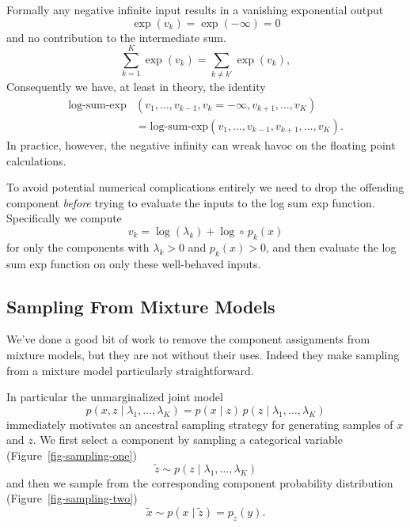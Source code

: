 \documentclass[
  letterpaper,
  DIV=11,
  numbers=noendperiod]{scrartcl}
\begin{document}
Formally any negative infinite input results in a vanishing exponential
output \[
\exp(v_{k}) = \exp(-\infty) = 0
\] and no contribution to the intermediate sum. \[
\sum_{k = 1}^{K} \exp(v_{k}) = \sum_{k \ne k'} \exp (v_{k}),
\] Consequently we have, at least in theory, the identity \begin{align*}
\text{log-sum-exp}&(v_{1}, \ldots, v_{k - 1}, v_{k} = -\infty,
                    v_{k + 1}, \ldots, v_{K})
\\
&=
\text{log-sum-exp}(v_{1}, \ldots, v_{k - 1},
                   v_{k + 1}, \ldots, v_{K}).
\end{align*} In practice, however, the negative infinity can wreak havoc
on the floating point calculations.

To avoid potential numerical complications entirely we need to drop the
offending component \emph{before} trying to evaluate the inputs to the
log sum exp function. Specifically we compute \[
v_{k} = \log(\lambda_{k}) + \log \circ \, p_{k} (x)
\] for only the components with \(\lambda_{k} > 0\) and
\(p_{k}(x) > 0\), and then evaluate the log sum exp function on only
these well-behaved inputs.

\subsection{Sampling From Mixture Models}\label{sec:sampling}

We've done a good bit of work to remove the component assignments from
mixture models, but they are not without their uses. Indeed they make
sampling from a mixture model particularly straightforward.

In particular the unmarginalized joint model \[
p(x, z \mid \lambda_{1}, \ldots, \lambda_{K})
=
p(x \mid z) \, p(z \mid \lambda_{1}, \ldots, \lambda_{K})
\] immediately motivates an ancestral sampling strategy for generating
samples of \(x\) and \(z\). We first select a component by sampling a
categorical variable (Figure~\ref{fig-sampling-one}) \[
\tilde{z} \sim p(z \mid \lambda_{1}, \ldots, \lambda_{K})
\] and then we sample from the corresponding component probability
distribution (Figure~\ref{fig-sampling-two}) \[
\tilde{x} \sim p(x \mid \tilde{z}) = p_{\tilde{z}}(y).
\]
\end{document}
